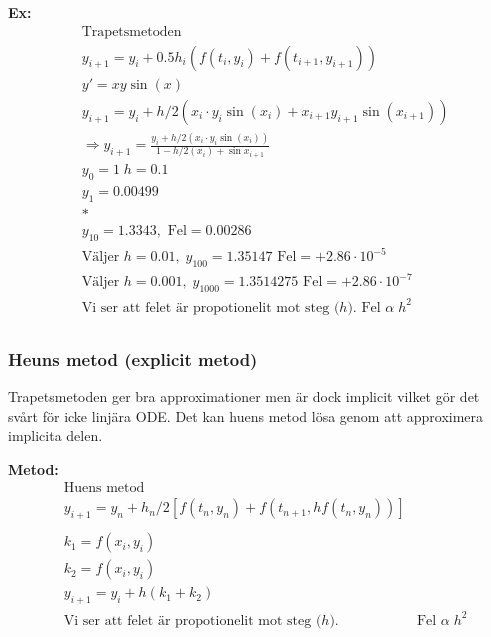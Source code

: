 \begin{multicols}{2}
\textbf{Ex:}
\begin{align*}
  &\text{Trapetsmetoden } \\
  &y_{i+1}=y_i + 0.5h_i(f(t_i,y_i) + f(t_{i+1},y_{i+1})) \\
  &y'=xy\sin(x) \\
  &y_{i+1} = y_i+h/2(x_i\cdot{y_i}\sin(x_i)+x_{i+1}y_{i+1}\sin{(x_{i+1})}) \\
  &\Rightarrow y_{i+1} = \frac{y_i+h/2(x_i\cdot{y_i}\sin(x_i))}{1-h/2(x_i)+\sin{x_{i+1}}} \\
  &y_0=1 \; h=0.1 \\
  &y_1=0.00499 \\
  &* \\
  &y_{10}=1.3343, \text{ Fel} = 0.00286 \\
  &\text{Väljer } h=0.01, \; y_{100} = 1.35147 \text{ Fel} = +2.86\cdot10^{-5} \\
  &\text{Väljer } h=0.001, \; y_{1000} = 1.3514275 \text{ Fel} = +2.86\cdot10^{-7} \\
  &\text{Vi ser att felet är propotionelit mot steg ($h$). Fel } \alpha \; h^2 \\
\end{align*}

\subsubsection{Heuns metod (explicit metod)}
Trapetsmetoden ger bra approximationer men är dock implicit vilket gör det svårt för icke linjära
ODE. Det kan huens metod lösa genom att approximera implicita delen.

\textbf{Metod:}
\begin{align*}
  &\text{Huens metod } \\
  &y_{i+1} = y_n + h_n/2[f(t_n,y_n) + f(t_{n+1},hf(t_n,y_n))] \\
  &\\
  &k_1=f(x_i,y_i) \\
  &k_2=f(x_i,y_i) \\
  &y_{i+1} = y_i+h(k_1+k_2) \\
  &\text{Vi ser att felet är propotionelit mot steg ($h$).}  
  &\text{Fel } \alpha \; h^2 \\
\end{align*}


\end{multicols}
